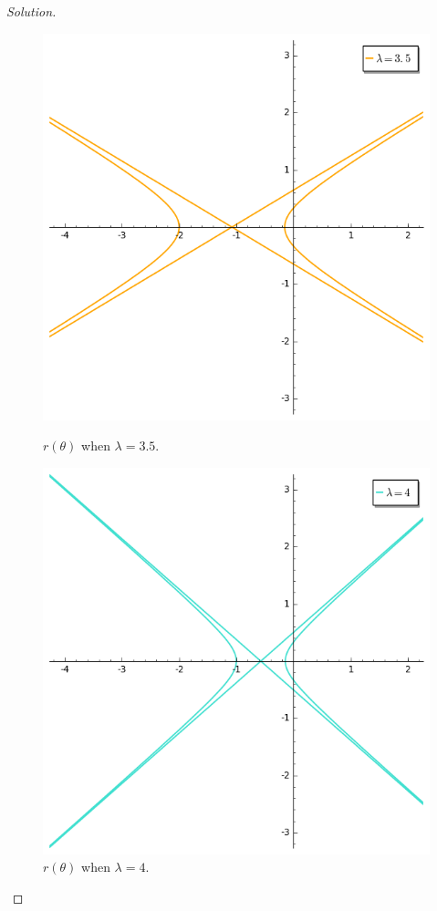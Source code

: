 \documentclass[letterpaper, 12pt]{amsart}
\theoremstyle{definition}  							%
\begin{document}
\begin{proof}[Solution]
		\begin{figure}[b]
			\centering
			\begin{minipage}[b]{.4\textwidth}
				\includegraphics[scale=0.38]{images/lambda35.png}
				\caption{$r(\theta)$ when $\lambda = 3.5$.}
				\label{lambda_35}
			\end{minipage}
			\qquad
			\begin{minipage}[b]{.4\textwidth}
				\includegraphics[scale=0.38]{images/lambda4.png}
				\caption{$r(\theta)$ when $\lambda = 4$.}
				\label{lambda_4}
			\end{minipage}
		\end{figure}
		\end{proof}
\end{document}
